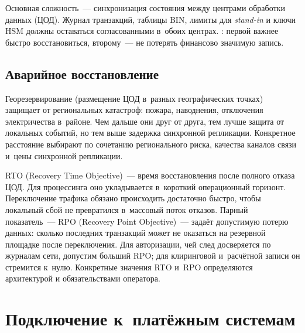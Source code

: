 Основная сложность~--- синхронизация состояния между центрами обработки данных (ЦОД).
Журнал транзакций, таблицы BIN, лимиты для \textit{stand-in} и ключи HSM
должны оставаться согласованными в~обоих центрах.
: первой важнее быстро восстановиться, второму~---
не потерять финансово значимую запись.

\subsection*{Аварийное восстановление}

Георезервирование (размещение ЦОД в~разных географических
точках) защищает от региональных катастроф: пожара, наводнения,
отключения электричества в~районе. Чем дальше они друг от друга,
тем лучше защита от локальных событий, но тем выше задержка
синхронной репликации.
Конкретное расстояние выбирают по сочетанию регионального риска,
качества каналов связи и~цены синхронной репликации.

RTO (Recovery Time Objective)~--- время восстановления
после полного отказа ЦОД. Для процессинга оно укладывается
в~короткий операционный горизонт. Переключение трафика
обязано происходить достаточно быстро, чтобы локальный сбой
не превратился в~массовый поток отказов. Парный показатель~--- RPO (Recovery Point Objective)~--- задаёт допустимую потерю данных:
сколько последних транзакций может не оказаться на резервной площадке
после переключения. Для авторизации, чей след досверяется
по журналам сети, допустим больший RPO; для клиринговой и~расчётной
записи он стремится к~нулю. Конкретные значения RTO и~RPO
определяются архитектурой и обязательствами оператора.

\section{Подключение к~платёжным системам}\label{sec:pc-connectivity}

